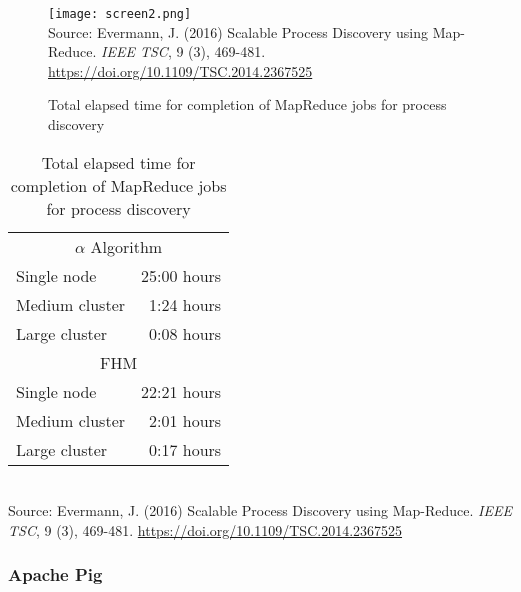 \begin{figure}
\centering

\texttt{[image: screen2.png]} \\

\scriptsize
Source: Evermann, J. (2016) Scalable Process Discovery using Map-Reduce. \emph{IEEE TSC}, 9 (3), 469-481. \footnotesize \url{https://doi.org/10.1109/TSC.2014.2367525}
\caption[MapReduce performance for process discovery]{Total elapsed time for completion of MapReduce jobs for process discovery}
\label{fig:processdiscoveryresults}
\end{figure}

\begin{table}
\centering

\begin{tabular}{lr} \hline
\multicolumn{2}{c}{$\alpha$ Algorithm} \\
Single node & 25:00 hours \\
Medium cluster & 1:24 hours \\
Large cluster & 0:08 hours \\ \hline
\multicolumn{2}{c}{FHM} \\
Single node & 22:21 hours\\
Medium cluster & 2:01 hours \\
Large cluster & 0:17 hours \\ \hline
\end{tabular} \\

\vspace{\baselineskip}
\scriptsize
Source: Evermann, J. (2016) Scalable Process Discovery using Map-Reduce. \emph{IEEE TSC}, 9 (3), 469-481. \footnotesize \url{https://doi.org/10.1109/TSC.2014.2367525}
\caption[MapReduce performance for process discovery]{Total elapsed time for completion of MapReduce jobs for process discovery}
\label{tab:processdiscoveryresults}
\end{table}

\FloatBarrier
\subsubsection*{Apache Pig}

